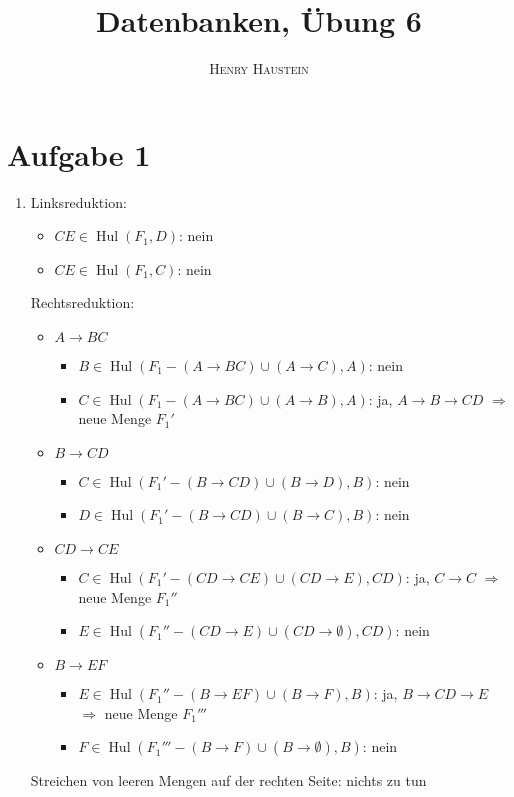 \documentclass{article}
\title{\textbf{Datenbanken, Übung 6}}
\author{\textsc{Henry Haustein}}
\date{}
\DeclareMathOperator{\Hul}{Hul}
\begin{document}
	\maketitle
	
	\section*{Aufgabe 1}
	\begin{enumerate}[label=(\alph*)]
		\item Linksreduktion:
		\begin{itemize}
			\item $CE\in\Hul(F_1,D)$: nein
			\item $CE\in\Hul(F_1,C)$: nein
		\end{itemize}
		Rechtsreduktion:
		\begin{itemize}
			\item $A\to BC$
			\begin{itemize}
				\item $B\in\Hul(F_1-(A\to BC) \cup (A\to C), A)$: nein
				\item $C\in\Hul(F_1-(A\to BC) \cup (A\to B), A)$: ja, $A\to B\to CD$ $\Rightarrow$ neue Menge $F_1'$
			\end{itemize} 
			\item $B\to CD$
			\begin{itemize}
				\item $C\in\Hul(F_1'-(B\to CD) \cup (B\to D), B)$: nein
				\item $D\in\Hul(F_1'-(B\to CD) \cup (B\to C), B)$: nein
			\end{itemize}
			\item $CD\to CE$
			\begin{itemize}
				\item $C\in\Hul(F_1'-(CD\to CE) \cup (CD\to E), CD)$: ja, $C\to C$ $\Rightarrow$ neue Menge $F_1''$
				\item $E\in\Hul(F_1''-(CD\to E) \cup (CD\to \emptyset), CD)$: nein
			\end{itemize}
			\item $B\to EF$
			\begin{itemize}
				\item $E\in\Hul(F_1''-(B\to EF) \cup (B\to F), B)$: ja, $B\to CD\to E$ $\Rightarrow$ neue Menge $F_1'''$
				\item $F\in\Hul(F_1'''-(B\to F) \cup (B\to \emptyset), B)$: nein
			\end{itemize}
		\end{itemize}
		Streichen von leeren Mengen auf der rechten Seite: nichts zu tun \\

\end{enumerate}
\end{document}
